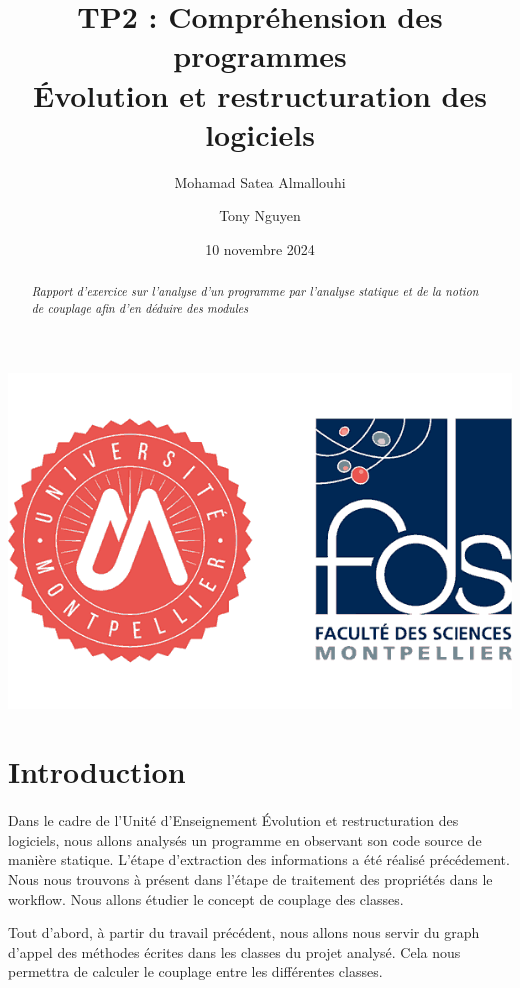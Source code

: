 \documentclass[a4paper]{article}
\title{  TP2 : Compréhension des programmes\\Évolution et restructuration des logiciels}
\author{Mohamad Satea Almallouhi \and Tony Nguyen}
\date{10 novembre 2024}
\begin{document}
    \maketitle
    \begin{center}
        \includegraphics[width=\textwidth]{logo}
    \end{center}

    \begin{abstract}     %
      \emph{Rapport d'exercice sur l'analyse d'un programme par l'analyse statique et de la notion de couplage afin d'en déduire des modules}
    \end{abstract}
    \newpage
    \tableofcontents
    \listofalgorithms
    \section*{Introduction}
            \paragraph{}
                Dans le cadre de l'Unité d'Enseignement Évolution et restructuration des logiciels, nous allons analysés un programme en observant son code source de manière statique. L'étape d'extraction des informations a été réalisé précédement. Nous nous trouvons à présent dans l'étape de traitement des propriétés dans le workflow. Nous allons étudier le concept de couplage des classes.

                Tout d'abord, à partir du travail précédent, nous allons nous servir du graph d'appel des méthodes écrites dans les classes du projet analysé. Cela nous permettra de calculer le couplage entre les différentes classes.
\end{document}
